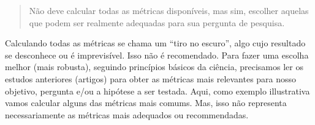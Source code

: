 \documentclass[
]{article}
\begin{document}
\newpage

\begin{quote}
Não deve calcular todas as métricas disponíveis, mas sim, escolher aquelas que podem ser realmente adequadas para sua pergunta de pesquisa.
\end{quote}

Calculando todas as métricas se chama um ``tiro no escuro'', algo cujo resultado se desconhece ou é imprevisível. Isso não é recomendado. Para fazer uma escolha melhor (mais robusta), seguindo princípios básicos da ciência, precisamos ler os estudos anteriores (artigos) para obter as métricas mais relevantes para nosso objetivo, pergunta e/ou a hipótese a ser testada.
Aqui, como exemplo illustrativa vamos calcular alguns das métricas mais comums. Mas, isso não representa necessariamente as métricas mais adequados ou recommendadas.
\end{document}
